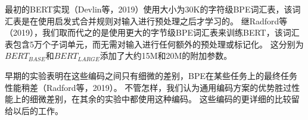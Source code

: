 \documentclass[lang=cn,11pt,a4paper,twocolumn]{elegantpaper}
\begin{document}
最初的BERT实现（Devlin等，2019）使用大小为30K的字符级BPE词汇表，该词汇表是在使用启发式合并规则对输入进行预处理之后才学习的。 继Radford等（2019），我们取而代之的是使用更大的字节级BPE词汇表来训练BERT，该词汇表包含5万个子词单元，而无需对输入进行任何额外的预处理或标记化。 这分别为$BERT_{BASE}$和$BERT_{LARGE}$添加了大约15M和20M的附加参数。

早期的实验表明在这些编码之间只有细微的差别，BPE在某些任务上的最终任务性能稍差（Radford等，2019）。 不管怎样，我们认为通用编码方案的优势胜过性能上的细微差别，在其余的实验中都使用这种编码。 这些编码的更详细的比较留给以后的工作。

\nocite{*}

\end{document}
